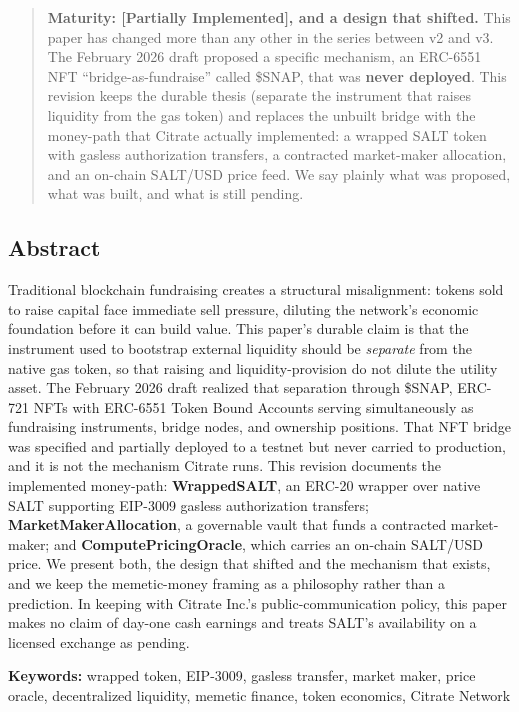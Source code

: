 \begin{quote}
\textbf{Maturity: {[}Partially Implemented{]}, and a design that
shifted.} This paper has changed more than any other in the series
between v2 and v3. The February 2026 draft proposed a specific
mechanism, an ERC-6551 NFT ``bridge-as-fundraise'' called \$SNAP, that
was \textbf{never deployed}. This revision keeps the durable thesis
(separate the instrument that raises liquidity from the gas token) and
replaces the unbuilt bridge with the money-path that Citrate actually
implemented: a wrapped SALT token with gasless authorization transfers,
a contracted market-maker allocation, and an on-chain SALT/USD price
feed. We say plainly what was proposed, what was built, and what is
still pending.
\end{quote}

\subsection{Abstract}\label{abstract}

Traditional blockchain fundraising creates a structural misalignment:
tokens sold to raise capital face immediate sell pressure, diluting the
network's economic foundation before it can build value. This paper's
durable claim is that the instrument used to bootstrap external
liquidity should be \emph{separate} from the native gas token, so that
raising and liquidity-provision do not dilute the utility asset. The
February 2026 draft realized that separation through \$SNAP, ERC-721
NFTs with ERC-6551 Token Bound Accounts serving simultaneously as
fundraising instruments, bridge nodes, and ownership positions. That NFT
bridge was specified and partially deployed to a testnet but never
carried to production, and it is not the mechanism Citrate runs. This
revision documents the implemented money-path: \textbf{WrappedSALT}, an
ERC-20 wrapper over native SALT supporting EIP-3009 gasless
authorization transfers; \textbf{MarketMakerAllocation}, a governable
vault that funds a contracted market-maker; and
\textbf{ComputePricingOracle}, which carries an on-chain SALT/USD price.
We present both, the design that shifted and the mechanism that exists,
and we keep the memetic-money framing as a philosophy rather than a
prediction. In keeping with Citrate Inc.'s public-communication policy,
this paper makes no claim of day-one cash earnings and treats SALT's
availability on a licensed exchange as pending.

\textbf{Keywords:} wrapped token, EIP-3009, gasless transfer, market
maker, price oracle, decentralized liquidity, memetic finance, token
economics, Citrate Network


